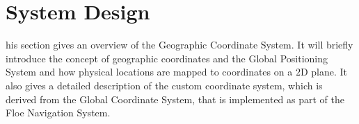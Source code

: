 %
%
\let\textcircled=\pgftextcircled
\chapter{System Design}
\label{chap:systemdesign}
\noindent
{}his section gives an overview of the Geographic Coordinate System. It will briefly introduce the concept of geographic coordinates and the Global Positioning System and how physical locations are mapped to coordinates on a $2$D plane. It also gives a detailed description of the custom coordinate system, which is derived from the Global Coordinate System, that is implemented as part of the Floe Navigation System.
%
